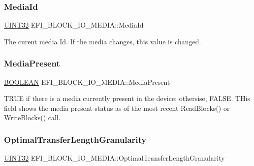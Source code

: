 \subsubsection{\texorpdfstring{Media\+Id}{MediaId}}
{\footnotesize\ttfamily \hyperlink{_processor_bind_8h_ae1e6edbbc26d6fbc71a90190d0266018}{U\+I\+N\+T32} E\+F\+I\+\_\+\+B\+L\+O\+C\+K\+\_\+\+I\+O\+\_\+\+M\+E\+D\+I\+A\+::\+Media\+Id}

The curent media Id. If the media changes, this value is changed. \mbox{\label{struct_e_f_i___b_l_o_c_k___i_o___m_e_d_i_a_ac67e4efd7f139b76a2cfcf5750fb52fc}} 
\subsubsection{\texorpdfstring{Media\+Present}{MediaPresent}}
{\footnotesize\ttfamily \hyperlink{_processor_bind_8h_a112e3146cb38b6ee95e64d85842e380a}{B\+O\+O\+L\+E\+AN} E\+F\+I\+\_\+\+B\+L\+O\+C\+K\+\_\+\+I\+O\+\_\+\+M\+E\+D\+I\+A\+::\+Media\+Present}

T\+R\+UE if there is a media currently present in the device; othersise, F\+A\+L\+SE. T\+His field shows the media present status as of the most recent Read\+Blocks() or Write\+Blocks() call. \mbox{\label{struct_e_f_i___b_l_o_c_k___i_o___m_e_d_i_a_a703097ebf35d23eae45d941134b7ad9c}} 
\subsubsection{\texorpdfstring{Optimal\+Transfer\+Length\+Granularity}{OptimalTransferLengthGranularity}}
{\footnotesize\ttfamily \hyperlink{_processor_bind_8h_ae1e6edbbc26d6fbc71a90190d0266018}{U\+I\+N\+T32} E\+F\+I\+\_\+\+B\+L\+O\+C\+K\+\_\+\+I\+O\+\_\+\+M\+E\+D\+I\+A\+::\+Optimal\+Transfer\+Length\+Granularity}

